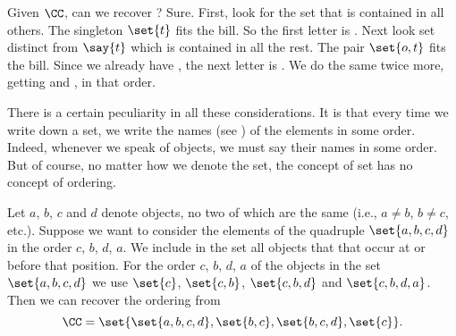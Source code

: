 Given $\CC$, can we recover ?
Sure.
First, look for the set that is contained in all others.
The singleton $\set{t}$ fits the bill.
So the first letter is .
Next look set distinct from $\say{t}$ which is contained in all the rest.
The pair $\set{o, t}$ fits the bill.
Since we already have , the next letter is .
We do the same twice more, getting  and , in that order.

There is a certain peculiarity in all these considerations.
It is that every time we write down a set, we write the names (see ) of the elements in some order.
Indeed, whenever we speak of objects, we must say their names in some order.
But of course, no matter how we denote the set, the concept of set has no concept of ordering.


Let $a$, $b$, $c$ and $d$ denote objects, no two of which are the same (i.e., $a \neq b$, $b \neq c$, etc.).
Suppose we want to consider the elements of the quadruple $\set{a, b, c, d}$ in the order $c$, $b$, $d$, $a$.
We include in the set all objects that that occur at or before that position.
For the order $c$, $b$, $d$, $a$ of the objects in the set $\set{a, b, c, d}$ we use $\set{c}$, $\set{c, b}$, $\set{c, b, d}$ and $\set{c, b, d, a}$.
Then we can recover the ordering from
\[
  \CC = \set{\set{a, b, c, d}, \set{b, c}, \set{b, c, d}, \set{c}}.
\]
